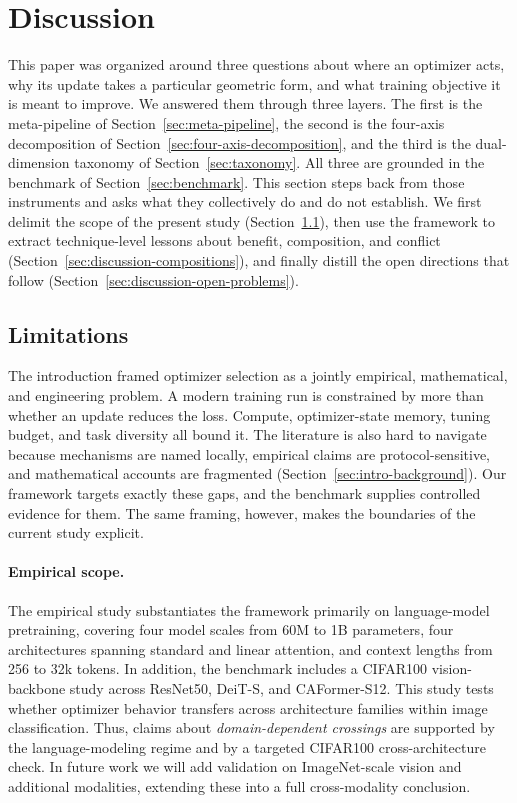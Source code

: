 \section{Discussion}
\label{sec:discussion}

This paper was organized around three questions about where an optimizer acts,
why its update takes a particular geometric form, and what training objective it
is meant to improve. We answered them through three layers. The first is the
meta-pipeline of Section~\ref{sec:meta-pipeline}, the second is the four-axis
decomposition of Section~\ref{sec:four-axis-decomposition}, and the third is
the dual-dimension taxonomy of Section~\ref{sec:taxonomy}. All three are
grounded in the benchmark of Section~\ref{sec:benchmark}. This section steps back from those instruments and asks what they collectively do and
do not establish. We first delimit the scope
of the present study (Section~\ref{sec:discussion-limitations}), then use the
framework to extract technique-level lessons about benefit, composition, and
conflict (Section~\ref{sec:discussion-compositions}), and finally
distill the open directions that follow (Section~\ref{sec:discussion-open-problems}).

\subsection{Limitations}
\label{sec:discussion-limitations}

The introduction framed optimizer selection as a jointly empirical,
mathematical, and engineering problem. A modern training run is constrained by more than whether an update reduces the
loss. Compute, optimizer-state memory, tuning budget, and task diversity all
bound it. The literature is also hard to navigate because mechanisms are named
locally, empirical claims are protocol-sensitive, and mathematical accounts are
fragmented
(Section~\ref{sec:intro-background}). Our framework targets exactly these gaps,
and the benchmark supplies controlled evidence for them. The same framing,
however, makes the boundaries of the current study explicit.

\paragraph{Empirical scope.}
The empirical study substantiates the framework primarily on language-model
pretraining, covering four model scales from 60M to 1B parameters, four
architectures spanning standard and linear attention, and context lengths from
256 to 32k tokens. In addition, the benchmark includes a CIFAR100 vision-backbone study across
ResNet50, DeiT-S, and CAFormer-S12. This study tests whether optimizer behavior
transfers across architecture families within image classification.
Thus, claims about \emph{domain-dependent crossings} are supported by the
language-modeling regime and by a targeted CIFAR100 cross-architecture check.
In future work we will add validation on ImageNet-scale vision and additional
modalities, extending these into a full cross-modality conclusion.

